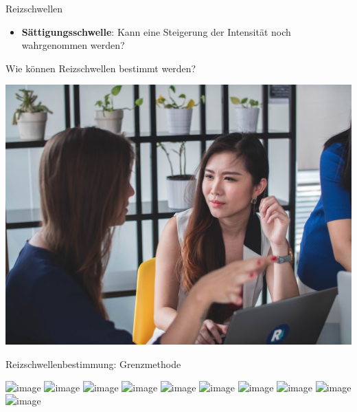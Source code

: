 \documentclass[aspectratio=169]{beamer}
\begin{document}
\begin{frame}{Reizschwellen}
\begin{itemize}
\begin{columns}[c]
\begin{column}{3cm}
    \end{column}
    
\end{columns}

$\,$\\

\pause
    \item
\textbf{Sättigungsschwelle}: Kann eine Steigerung der Intensität noch wahrgenommen werden?
\end{itemize}
    
    
\end{frame}


\begin{frame}{Wie können Reizschwellen bestimmt werden?}

\begin{center}
    \includegraphics[width=\textwidth]{zweiergespraech.jpg}
\end{center}

    
\end{frame}



\begin{frame}{Reizschwellenbestimmung: Grenzmethode}


\begin{center}
\includegraphics<1>[width=0.4\textwidth]{reizschwelle_seriell_1.png}
\includegraphics<2>[width=0.4\textwidth]{reizschwelle_seriell_2.png}
\includegraphics<3>[width=0.4\textwidth]{reizschwelle_seriell_3.png}
\includegraphics<4>[width=0.4\textwidth]{reizschwelle_seriell_4.png}
\includegraphics<5>[width=0.4\textwidth]{reizschwelle_seriell_5.png}
\includegraphics<6>[width=0.4\textwidth]{reizschwelle_seriell_6.png}
\includegraphics<7>[width=0.4\textwidth]{reizschwelle_seriell_7.png}
\includegraphics<8>[width=0.4\textwidth]{reizschwelle_seriell_8.png}
\includegraphics<9>[width=0.4\textwidth]{reizschwelle_seriell_9.png}
\includegraphics<10>[width=0.4\textwidth]{reizschwelle_seriell_10.png}
\end{center}

    
\end{frame}
\end{document}

